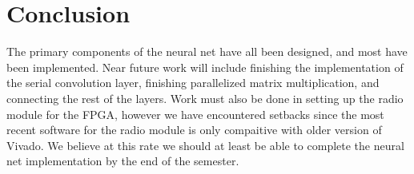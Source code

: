 \section{Conclusion}
The primary components of the neural net have all been designed, and most have been implemented.  Near future work will include finishing the implementation of the serial convolution layer, finishing parallelized matrix multiplication, and connecting the rest of the layers.  Work must also be done in setting up the radio module for the FPGA, however we have encountered setbacks since the most recent software for the radio module is only compaitive with older version of Vivado.  We believe at this rate we should at least be able to complete the neural net implementation by the end of the semester.
